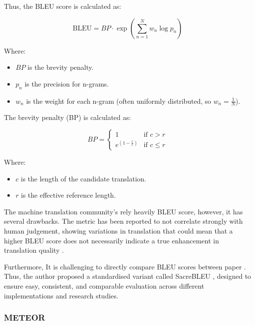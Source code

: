 \documentclass[a4paper]{article}
\begin{document}
Thus, the BLEU score is calculated as:

\begin{equation}
    \text{BLEU} = BP \cdot \exp \left( \sum_{n=1}^{N} w_n \log p_n \right)
\end{equation}

Where:
\begin{itemize}
    \item \( BP \) is the brevity penalty.
    \item \( p_n \) is the precision for n-grams.
    \item \( w_n \) is the weight for each n-gram (often uniformly distributed, so \( w_n = \frac{1}{N} \)).
\end{itemize}

The brevity penalty (BP) is calculated as:

\begin{equation}
    BP = \begin{cases}
        1                     & \text{if } c > r    \\
        e^{(1 - \frac{r}{c})} & \text{if } c \leq r
    \end{cases}
\end{equation}

Where:
\begin{itemize}
    \item \( c \) is the length of the candidate translation.
    \item \( r \) is the effective reference length.
\end{itemize}

The machine translation community's rely heavily BLEU score, however, it has several drawbacks. The metric has been reported to not correlate strongly with human judgement, showing variations in translation that could mean that a higher BLEU score does not necessarily indicate a true enhancement in translation quality \cite{callison-burch-2006-reevaluating-bleu}.

Furthermore, It is challenging to directly compare BLEU scores between paper \cite{post-2018-sacrebleu}. Thus, the author proposed a standardised variant called SacreBLEU \cite{post-2018-sacrebleu}, designed to ensure easy, consistent, and comparable evaluation across different implementations and research studies.

\subsubsection{METEOR}
\end{document}
